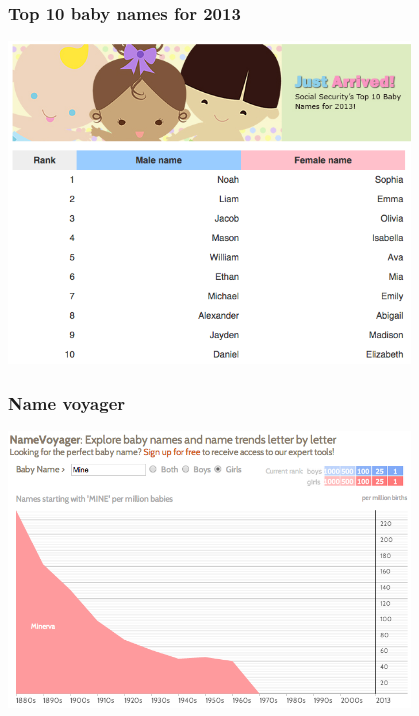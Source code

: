 \documentclass[11pt,containsverbatim,handout,xcolor=xelatex,dvipsnames,table]{beamer}
\begin{document}

\begin{frame}
\frametitle{Top 10 baby names for 2013}

\begin{center}
\includegraphics[width=0.8\textwidth]{figures/babynames2013}
\end{center}


\end{frame}


\begin{frame}
\frametitle{Name voyager}

\begin{center}
\includegraphics[width=0.8\textwidth]{figures/namevoyager_mine}
\end{center}


\end{frame}
\end{document}
